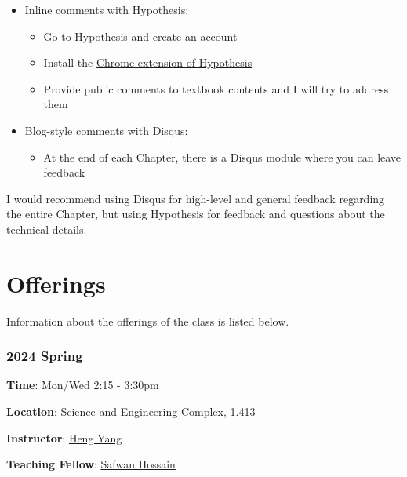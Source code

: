 \documentclass[
]{book}
\providecommand{\tightlist}{%
  \setlength{\itemsep}{0pt}\setlength{\parskip}{0pt}}
\theoremstyle{definition}
\theoremstyle{definition}
\theoremstyle{definition}
\theoremstyle{definition}
\theoremstyle{remark}
\begin{document}
\begin{itemize}
\tightlist
\item
  Inline comments with Hypothesis:

  \begin{itemize}
  \tightlist
  \item
    Go to \href{https://hypothes.is}{Hypothesis} and create an account
  \item
    Install the \href{https://chrome.google.com/webstore/detail/hypothesis-web-pdf-annota/bjfhmglciegochdpefhhlphglcehbmek}{Chrome extension of Hypothesis}
  \item
    Provide public comments to textbook contents and I will try to address them
  \end{itemize}
\item
  Blog-style comments with Disqus:

  \begin{itemize}
  \tightlist
  \item
    At the end of each Chapter, there is a Disqus module where you can leave feedback
  \end{itemize}
\end{itemize}

I would recommend using Disqus for high-level and general feedback regarding the entire Chapter, but using Hypothesis for feedback and questions about the technical details.

\hypertarget{offerings}{%
\section*{Offerings}\label{offerings}}

Information about the offerings of the class is listed below.

\hypertarget{spring}{%
\subsubsection*{2024 Spring}\label{spring}}

\textbf{Time}: Mon/Wed 2:15 - 3:30pm

\textbf{Location}: Science and Engineering Complex, 1.413

\textbf{Instructor}: \href{https://hankyang.seas.harvard.edu/}{Heng Yang}

\textbf{Teaching Fellow}: \href{https://safwanhossain.github.io/}{Safwan Hossain}
\end{document}
